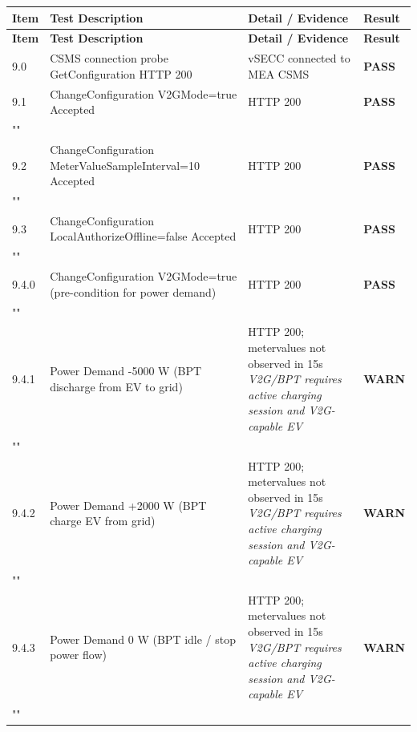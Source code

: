 \documentclass[10pt, a4paper]{article}
\begin{document}
\renewcommand{\arraystretch}{1.35}
\begin{longtable}{|L{1cm}|L{5.5cm}|M{7cm}|C{1.8cm}|}
\hline
{}
\textbf{Item} & \small\textbf{Test Description} & \small\textbf{Detail / Evidence} & \small\textbf{Result} \\
\hline
\endfirsthead
\hline
{}
\textbf{Item} & \small\textbf{Test Description} & \small\textbf{Detail / Evidence} & \small\textbf{Result} \\
\hline
\endhead
\hline
\endfoot
\small 9.0 & \small CSMS connection probe  GetConfiguration HTTP 200 & vSECC connected to MEA CSMS & \textcolor{passgreen}{\textbf{PASS}} \\
\hline
\small 9.1 & \small ChangeConfiguration V2GMode=true  Accepted & HTTP 200 & \textcolor{passgreen}{\textbf{PASS}} \\
\hline
{} \\
\hline
\small 9.2 & \small ChangeConfiguration MeterValueSampleInterval=10  Accepted & HTTP 200 & \textcolor{passgreen}{\textbf{PASS}} \\
\hline
{} \\
\hline
\small 9.3 & \small ChangeConfiguration LocalAuthorizeOffline=false  Accepted & HTTP 200 & \textcolor{passgreen}{\textbf{PASS}} \\
\hline
{} \\
\hline
\small 9.4.0 & \small ChangeConfiguration V2GMode=true (pre-condition for power demand) & HTTP 200 & \textcolor{passgreen}{\textbf{PASS}} \\
\hline
{} \\
\hline
\small 9.4.1 & \small Power Demand -5000 W (BPT discharge from EV to grid) & HTTP 200; metervalues not observed in 15s{\newline\normalfont\footnotesize\itshape V2G/BPT requires active charging session and V2G-capable EV} & \textcolor{warnorange}{\textbf{WARN}} \\
\hline
{} \\
\hline
\small 9.4.2 & \small Power Demand +2000 W (BPT charge EV from grid) & HTTP 200; metervalues not observed in 15s{\newline\normalfont\footnotesize\itshape V2G/BPT requires active charging session and V2G-capable EV} & \textcolor{warnorange}{\textbf{WARN}} \\
\hline
{} \\
\hline
\small 9.4.3 & \small Power Demand 0 W (BPT idle / stop power flow) & HTTP 200; metervalues not observed in 15s{\newline\normalfont\footnotesize\itshape V2G/BPT requires active charging session and V2G-capable EV} & \textcolor{warnorange}{\textbf{WARN}} \\
\hline
{} \\
\hline
\end{longtable}
\normalsize
\end{document}
